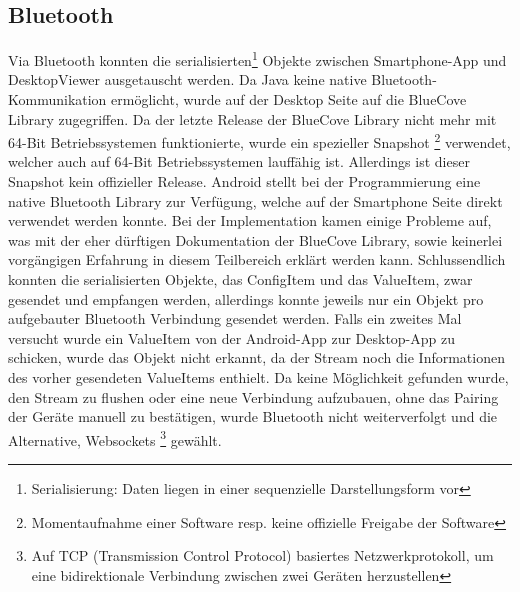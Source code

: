 \subsection{Bluetooth}
Via Bluetooth konnten die serialisierten\footnote{Serialisierung: Daten liegen in einer sequenzielle Darstellungsform vor} 
Objekte zwischen Smartphone-App und DesktopViewer ausgetauscht werden. 
Da Java keine native Bluetooth-Kommunikation ermöglicht, wurde auf der 
Desktop Seite auf die BlueCove Library \cite{Inf:Bluecove} zugegriffen. Da der letzte Release der 
BlueCove Library nicht mehr mit 64-Bit Betriebssystemen funktionierte, wurde ein spezieller Snapshot 
\footnote{Momentaufnahme einer Software resp. keine offizielle Freigabe der Software} 
verwendet, welcher auch auf 64-Bit Betriebssystemen lauffähig ist. Allerdings ist dieser Snapshot 
kein offizieller Release.
Android stellt bei der Programmierung eine native Bluetooth 
Library zur Verfügung, welche auf der Smartphone Seite direkt verwendet werden konnte. 
Bei der Implementation kamen einige Probleme auf, was mit der eher dürftigen 
Dokumentation der BlueCove Library, sowie keinerlei vorgängigen Erfahrung in diesem Teilbereich 
erklärt werden kann. Schlussendlich konnten die serialisierten Objekte, das ConfigItem 
und das ValueItem, zwar gesendet und empfangen werden, allerdings konnte jeweils nur ein Objekt pro aufgebauter 
Bluetooth Verbindung gesendet werden. Falls ein zweites Mal versucht wurde ein ValueItem von der 
Android-App zur Desktop-App zu schicken, wurde das Objekt nicht erkannt, da der 
Stream noch die Informationen des vorher gesendeten ValueItems enthielt. 
Da keine Möglichkeit gefunden wurde, den Stream zu flushen oder eine neue 
Verbindung aufzubauen, ohne das Pairing der Geräte manuell zu bestätigen, wurde Bluetooth 
nicht weiterverfolgt und die Alternative, Websockets \footnote{Auf TCP (Transmission Control Protocol) basiertes Netzwerkprotokoll, 
um eine bidirektionale Verbindung zwischen zwei Geräten herzustellen} gewählt. 

            
